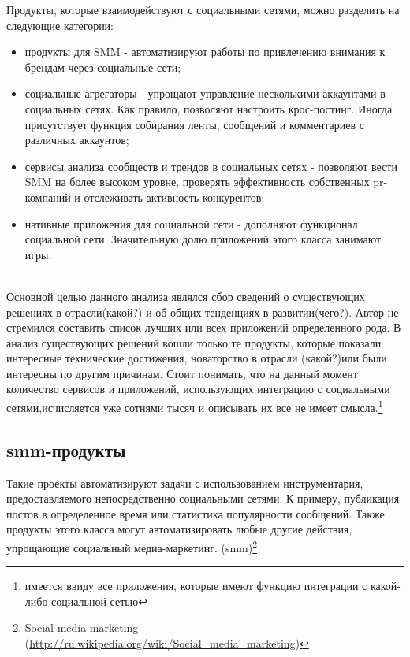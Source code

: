 \begin{itemize}
 Продукты, которые взаимодействуют с социальными сетями, можно разделить на следующие категории:
\begin{itemize}
\item продукты для SMM - автоматизируют работы по привлечению внимания к брендам через социальные сети;
\item социальные агрегаторы - упрощают управление несколькими аккаунтами в социальных сетях. Как правило, позволяют настроить крос-постинг. Иногда присутствует функция собирания ленты, сообщений и комментариев с различных аккаунтов;
\item сервисы анализа сообществ и трендов в социальных сетях - позволяют вести SMM на более высоком уровне, проверять эффективность собственных pr-компаний и отслеживать активность конкурентов;
\item нативные приложения для социальной сети - дополняют функционал социальной сети. Значительную долю приложений этого класса занимают игры.
\end{itemize} \\

Основной целью данного анализа  являлся сбор сведений о существующих решениях в отрасли(какой?) и об общих тенденциях в развитии(чего?).  Автор не стремился составить список лучших или всех приложений определенного рода. В анализ существующих решений вошли только те продукты, которые показали интересные технические достижения, новаторство в отрасли (какой?)или были интересны по другим причинам. Стоит понимать, что на данный момент количество сервисов и приложений, использующих интеграцию с социальными сетями,исчисляется уже сотнями тысяч и описывать их все не имеет смысла.\footnote{имеется ввиду все приложения, которые имеют функцию интеграции с какой-либо социальной сетью}
\subsection{smm-продукты}
Такие проекты автоматизируют задачи с использованием инструментария, предоставляемого непосредственно социальными сетями. К примеру, публикация постов в определенное время или статистика популярности сообщений. Также продукты этого класса могут автоматизировать любые другие действия, упрощающие социальный медиа-маркетинг. (smm)\footnote{Social media marketing (\url{http://ru.wikipedia.org/wiki/Social_media_marketing})}

\end{itemize}
